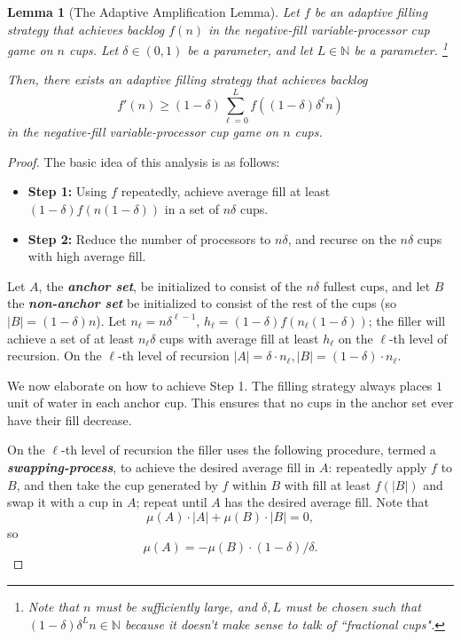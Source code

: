 \documentclass[twocolumn]{article}[10pt]
\newcommand{\defn}[1]{{\textit{\textbf{\boldmath #1}}}\xspace}
\newtheorem{lemma}{Lemma}
\begin{document}
\begin{lemma}[The Adaptive Amplification Lemma]\label{lem:adaptiveAmplification}
  Let $f$ be an adaptive filling strategy that achieves backlog $f(n)$ in the
  negative-fill variable-processor cup game on $n$ cups.
  Let $\delta\in(0,1)$ be a parameter, and let $L\in\mathbb{N}$ be a parameter.
  \footnote{Note that $n$ must be sufficiently large, and $\delta, L$ must be
  chosen such that $(1-\delta)\delta^L n \in \mathbb{N}$ because it doesn't
  make sense to talk of ``fractional cups".}

  Then, there exists an adaptive filling strategy that achieves backlog 
  $$f'(n) \ge (1-\delta)\sum_{\ell= 0}^{L} f((1-\delta)\delta^\ell n)$$
  in the negative-fill variable-processor cup game on $n$ cups.
\end{lemma}
\begin{proof}
  The basic idea of this analysis is as follows:
  \begin{itemize}
    \item \textbf{Step 1:} Using $f$ repeatedly, achieve average fill at least $(1-\delta)
      f(n(1-\delta))$ in a set of $n\delta$ cups. 
    \item \textbf{Step 2:} Reduce the number of processors to $n\delta$, and
      recurse on the $n\delta$ cups with high average fill.
  \end{itemize}

  Let $A$, the \defn{anchor set}, be initialized to consist of the $n\delta$
  fullest cups, and let $B$ the \defn{non-anchor set} be initialized to consist
  of the rest of the cups (so $|B| = (1-\delta)n$).
  Let $n_\ell = n\delta^{\ell-1}$, $h_\ell = (1-\delta)f(n_\ell(1-\delta))$;
  the filler will achieve a set of at least $n_\ell \delta$ cups with average
  fill at least $h_\ell$ on the $\ell$-th
  level of recursion. On the $\ell$-th level of recursion $|A| = \delta\cdot
  n_\ell, |B| = (1-\delta)\cdot n_\ell$.

  We now elaborate on how to achieve Step 1.
  The filling strategy always places $1$ unit of water in each anchor cup. This
  ensures that no cups in the anchor set ever have their fill decrease.

  On the $\ell$-th level of recursion the filler uses the following procedure,
  termed a \defn{swapping-process}, to achieve the desired average fill in $A$:
  repeatedly apply $f$ to $B$, and then take the cup generated by $f$ within
  $B$ with fill at least $f(|B|)$ and swap it with a cup in $A$; repeat until $A$ has
  the desired average fill. Note that $$\mu(A) \cdot |A| +\mu(B)\cdot |B| =
  0,$$ so $$\mu(A) = - \mu(B) \cdot (1-\delta)/ \delta.$$


\end{proof}
\end{document}
